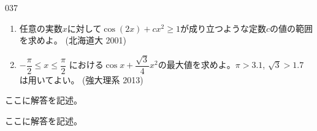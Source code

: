 \begin{prob}{037}{}{}
 \begin{enumerate}
  \item 任意の実数$x$に対して$\cos(2x)+cx^2\ge 1$が成り立つような定数$c$の値の範囲を求めよ。  (北海道大 2001)
  \item $-\dfrac{\pi}{2}\le x \le \dfrac{\pi}{2}$ における$\cos x+\dfrac{\sqrt{3}}{4}x^2$の最大値を求めよ。$\pi>3.1$, $\sqrt{3}>1.7$ は用いてよい。  (強大理系 2013)
 \end{enumerate}
\end{prob}
ここに解答を記述。

ここに解答を記述。